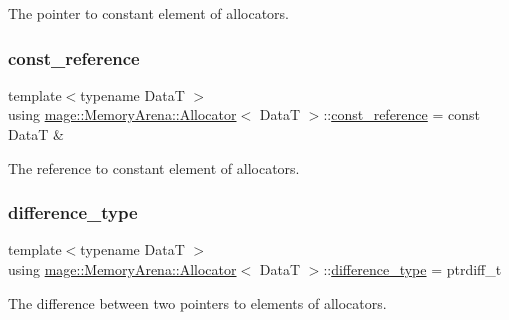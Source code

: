 The pointer to constant element of allocators. \hypertarget{structmage_1_1_memory_arena_1_1_allocator_a22e7c887e2578fb0cd253a6d7404ac1b}{}\label{structmage_1_1_memory_arena_1_1_allocator_a22e7c887e2578fb0cd253a6d7404ac1b} 
\subsubsection{\texorpdfstring{const\+\_\+reference}{const\_reference}}
{\footnotesize\ttfamily template$<$typename DataT $>$ \\
using \hyperlink{structmage_1_1_memory_arena_1_1_allocator}{mage\+::\+Memory\+Arena\+::\+Allocator}$<$ DataT $>$\+::\hyperlink{structmage_1_1_memory_arena_1_1_allocator_a22e7c887e2578fb0cd253a6d7404ac1b}{const\+\_\+reference} =  const DataT \&}

The reference to constant element of allocators. \hypertarget{structmage_1_1_memory_arena_1_1_allocator_ab9c65276a085579673b0e77efe64fdee}{}\label{structmage_1_1_memory_arena_1_1_allocator_ab9c65276a085579673b0e77efe64fdee} 
\subsubsection{\texorpdfstring{difference\+\_\+type}{difference\_type}}
{\footnotesize\ttfamily template$<$typename DataT $>$ \\
using \hyperlink{structmage_1_1_memory_arena_1_1_allocator}{mage\+::\+Memory\+Arena\+::\+Allocator}$<$ DataT $>$\+::\hyperlink{structmage_1_1_memory_arena_1_1_allocator_ab9c65276a085579673b0e77efe64fdee}{difference\+\_\+type} =  ptrdiff\+\_\+t}

The difference between two pointers to elements of allocators. \hypertarget{structmage_1_1_memory_arena_1_1_allocator_a06c19054bb02d7e7c982434c47f19adf}{}\label{structmage_1_1_memory_arena_1_1_allocator_a06c19054bb02d7e7c982434c47f19adf} 
